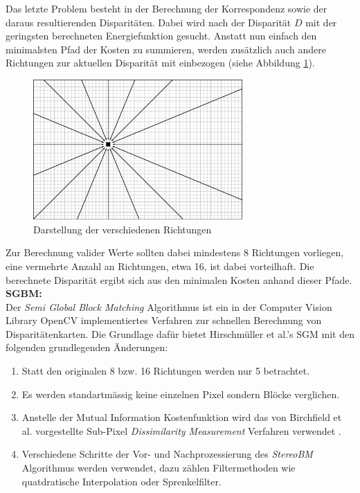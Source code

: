 \noindent
Das letzte Problem besteht in der Berechnung der Korrespondenz sowie der daraus resultierenden Disparitäten. Dabei wird nach der Disparität $D$ mit der geringsten berechneten Energiefunktion gesucht. Anstatt nun einfach den minimalsten Pfad der Kosten zu summieren, werden zusätzlich auch andere Richtungen zur aktuellen Disparität mit einbezogen (siehe Abbildung \ref{fig:sgm_directions}).

\begin{figure}[h]
	\centering
	\includegraphics[width=8cm]{img/sgm_directions.pdf}
	\caption{Darstellung der verschiedenen Richtungen}
	\label{fig:sgm_directions}
\end{figure}

\noindent
Zur Berechnung valider Werte sollten dabei mindestens 8 Richtungen vorliegen, eine vermehrte Anzahl an Richtungen, etwa 16, ist dabei vorteilhaft. Die berechnete Disparität ergibt sich aus den minimalen Kosten anhand dieser Pfade.\\

\noindent
\textbf{SGBM:} \\
Der \emph{Semi Global Block Matching} Algorithmus ist ein in der Computer Vision Library OpenCV implementiertes Verfahren zur schnellen Berechnung von Disparitätenkarten. Die Grundlage dafür bietet Hirschmüller et al.’s SGM \cite{hirschmueller2008sgm} mit den folgenden grundlegenden Änderungen:

\begin{enumerate}[label=C.\arabic*]
	\item Statt den originalen 8 bzw. 16 Richtungen werden nur 5 betrachtet. \label{item:differences_directions}
	\item Es werden  standartm\"assig keine einzelnen Pixel sondern Blöcke verglichen. \label{item:differences_matching}
	\item Anstelle der Mutual Information Kostenfunktion wird das von Birchfield et al. vorgestellte Sub-Pixel \emph{Dissimilarity Measurement} Verfahren verwendet \cite{birchfield-tomasi}.
	\item Verschiedene Schritte der Vor- und Nachprozessierung des \emph{StereoBM} Algorithmus werden verwendet, dazu zählen Filtermethoden wie quatdratische Interpolation oder Sprenkelfilter.
\end{enumerate}

